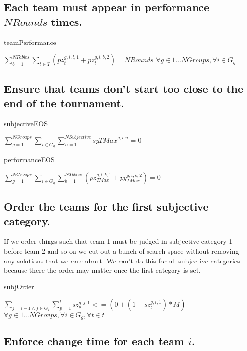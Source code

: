 \documentclass[letterpaper,11pt]{report}
\begin{document}
\FloatBarrier
\subsection{Each team must appear in performance $NRounds$ times.}

\begin{algorithm}
\caption{teamPerformance}
$\sum\limits_{b=1}^{NTables} \sum\limits_{t \in T} ( pz_{t}^{g,i,b,1} + pz_{t}^{g,i,b,2} ) = NRounds$
\hfill $
\forall g \in 1 \dots NGroups,
\forall i \in G_{g}
$
\end{algorithm}

\FloatBarrier
\subsection{Ensure that teams don't start too close to the end of the
  tournament.}
\begin{algorithm}
\caption{subjectiveEOS}
$
\sum\limits_{g=1}^{NGroups}
\sum\limits_{i \in G_{g}}
  \sum\limits_{n=1}^{NSubjective} sy{TMax}^{g,i,n} = 0$
\end{algorithm}

\begin{algorithm}
\caption{performanceEOS}
$
\sum\limits_{g=1}^{NGroups}
\sum\limits_{i \in G_{g}}
  \sum\limits_{b=1}^{NTables}
  ( pz_{TMax}^{g,i,b,1} + py_{TMax}^{g,i,b,2} ) = 0$
\end{algorithm}

\FloatBarrier
\subsection{Order the teams for the first subjective category.}
If we order things such that team 1 must be judged in subjective category 1
before team 2 and so on we cut out a bunch of search space without removing
any solutions that we care about. We can't do this for all subjective
categories because there the order may matter once the first category is
set.
\begin{algorithm}
\caption{subjOrder}
$
\sum\limits_{j = i+1 \wedge j \in G_{g}}
  \sum\limits_{p=1}^{t} sz_{p}^{g,j,1} <= 
( 0 + ( 1 - sz_{t}^{g,i,1} ) * M )$
\hfill $
\forall g \in 1 \dots NGroups,
\forall i \in G_{g}, 
\forall t \in t
$
\end{algorithm}

\FloatBarrier
\subsection{Enforce change time for each team $i$.}
\end{document}
